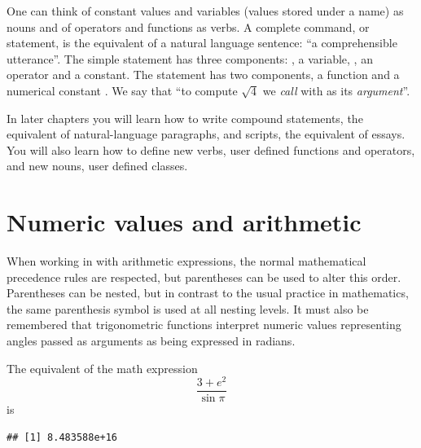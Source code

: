 \documentclass[krantz2]{krantz}\usepackage{knitr}%
\begin{document}
One can think of constant values and variables (values stored under a name) as nouns and of operators and functions as verbs. A complete command, or statement, is the equivalent of a natural language sentence: ``a comprehensible utterance''. The simple statement  has three components: , a variable, \code{+}, an operator and  a constant. The statement  has two components, a function  and a numerical constant . We say that ``to compute $\sqrt{4}$ we \emph{call}  with  as its \emph{argument}''.

In later chapters you will learn how to write compound statements, the equivalent of natural-language paragraphs, and scripts, the equivalent of essays. You will also learn how to define new verbs, user defined functions and operators, and new nouns, user defined classes.

\section{Numeric values and arithmetic}
\qRoperator{+}\qRoperator{-}\qRoperator{*}\qRoperator{/}
When working in \Rlang with arithmetic expressions, the normal mathematical precedence rules are respected, but parentheses can be used to alter this order. Parentheses can be nested, but in contrast to the usual practice in mathematics, the same parenthesis symbol is used at all nesting levels. It must also be remembered that trigonometric \Rlang functions interpret numeric values representing angles passed as arguments as being expressed in radians.

The equivalent of the math expression
$$
\frac{3 + e^2}{\sin \pi}
$$
is

\begin{knitrout}\footnotesize
{}\color{fgcolor}\begin{kframe}
\begin{alltt}
\hlstd{(} \hlopt{+} \hlstd{(}\hlstd{))} \hlopt{/} 
\end{alltt}
\begin{verbatim}
## [1] 8.483588e+16
\end{verbatim}
\end{kframe}
\end{knitrout}
\end{document}
